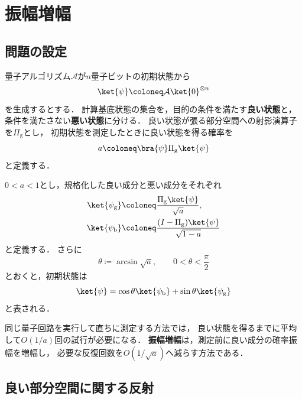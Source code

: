 \section{振幅増幅}
\label{sec:amplitude-amplification}

\subsection{問題の設定}
\label{subsec:amplitude-amplification-setting}

量子アルゴリズム$\mathcal{A}$が$n$量子ビットの初期状態から
\begin{equation}
  \ket{\psi}
  \coloneq
  \mathcal{A}\ket{0}^{\otimes n}
  \label{eq:amplitude-amplification-initial-state}
\end{equation}
を生成するとする．
計算基底状態の集合を，目的の条件を満たす\textbf{良い状態}と，
条件を満たさない\textbf{悪い状態}に分ける．
良い状態が張る部分空間への射影演算子を$\Pi_{\mathrm{g}}$とし，
初期状態を測定したときに良い状態を得る確率を
\begin{equation}
  a
  \coloneq
  \bra{\psi}\Pi_{\mathrm{g}}\ket{\psi}
  \label{eq:initial-good-probability}
\end{equation}
と定義する．

$0<a<1$とし，規格化した良い成分と悪い成分をそれぞれ
\begin{align}
  \ket{\psi_{\mathrm{g}}}
  &\coloneq
  \frac{\Pi_{\mathrm{g}}\ket{\psi}}{\sqrt{a}},
  \label{eq:normalized-good-state}\\
  \ket{\psi_{\mathrm{b}}}
  &\coloneq
  \frac{(I-\Pi_{\mathrm{g}})\ket{\psi}}{\sqrt{1-a}}
  \label{eq:normalized-bad-state}
\end{align}
と定義する．
さらに
\begin{equation}
  \theta
  \coloneq
  \arcsin\sqrt{a},
  \qquad
  0<\theta<\frac{\pi}{2}
  \label{eq:amplification-angle}
\end{equation}
とおくと，初期状態は
\begin{equation}
  \ket{\psi}
  =
  \cos\theta\ket{\psi_{\mathrm{b}}}
  +\sin\theta\ket{\psi_{\mathrm{g}}}
  \label{eq:good-bad-decomposition}
\end{equation}
と表される．

同じ量子回路を実行して直ちに測定する方法では，
良い状態を得るまでに平均して$O(1/a)$回の試行が必要になる．
\textbf{振幅増幅}は，測定前に良い成分の確率振幅を増幅し，
必要な反復回数を$O(1/\sqrt{a})$へ減らす方法である\cite{shimada2020}．

\subsection{良い部分空間に関する反射}
\label{subsec:good-subspace-reflection}

